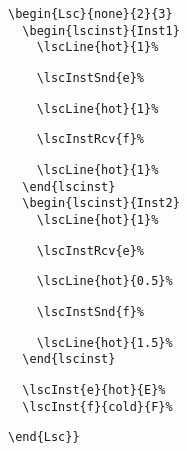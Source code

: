 \documentclass{article}
\begin{document}
\begin{center}%
\begin{minipage}{0.45\textwidth}%
\end{minipage}%
\hfill%
\begin{minipage}{0.33\textwidth}%
\small%
{\gray\begin{verbatim}
\begin{Lsc}{none}{2}{3}
  \begin{lscinst}{Inst1}
    \lscLine{hot}{1}%
\end{verbatim}}%
\verbunskip%
{\begin{verbatim}
    \lscInstSnd{e}%
\end{verbatim}}%
\verbunskip%
{\gray\begin{verbatim}
    \lscLine{hot}{1}%
\end{verbatim}}%
\verbunskip%
{\begin{verbatim}
    \lscInstRcv{f}%
\end{verbatim}}%
\verbunskip%
{\gray\begin{verbatim}
    \lscLine{hot}{1}%
  \end{lscinst}
  \begin{lscinst}{Inst2}
    \lscLine{hot}{1}%
\end{verbatim}}%
\verbunskip%
{\begin{verbatim}
    \lscInstRcv{e}%
\end{verbatim}}%
\verbunskip%
{\gray\begin{verbatim}
    \lscLine{hot}{0.5}%
\end{verbatim}}%
\verbunskip%
{\begin{verbatim}
    \lscInstSnd{f}%
\end{verbatim}}%
\verbunskip%
{\gray\begin{verbatim}
    \lscLine{hot}{1.5}%
  \end{lscinst}
\end{verbatim}}%
\verbunskip%
{\begin{verbatim}
  \lscInst{e}{hot}{E}%
  \lscInst{f}{cold}{F}%
\end{verbatim}}%
\verbunskip%
{\gray\begin{verbatim}
\end{Lsc}}
\end{verbatim}}%
\end{minipage}
\end{center}%
\end{document}

